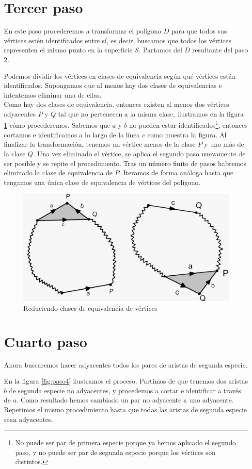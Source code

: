 \documentclass[a4paper,11pt,spanish, twoside, leqno]{tfg-uam}
\theoremstyle{definition}
\begin{document}
\section{Tercer paso}
En este paso procederemos a transformar el polígono $D$ para que todos sus vértices estén identificados entre sí, es decir, buscamos que todos los vértices representen el mismo punto en la superficie $S$. Partamos del $D$ resultante del paso 2.


Podemos dividir los vértices en clases de equivalencia según qué vértices están identificados. Supongamos que al menos hay dos clases de equivalencias e intentemos eliminar una de ellas.\\
Como hay dos clases de equivalencia, entonces existen al menos dos vértices adyacentes $P$ y $Q$ tal que no pertenecen a la misma clase, ilustramos en la figura \ref{fig:paso3} cómo procederemos. Sabemos que $a$ y $b$ no pueden estar identificados\footnote{No puede ser par de primera especie porque ya hemos aplicado el segundo paso, y no puede ser par de segunda especie porque los vértices son distintos.}, entonces cortamos e identificamos a lo largo de la línea $c$ como muestra la figura. Al finalizar la transformación, tenemos un vértice menos de la clase $P$ y uno más de la clase $Q$. Una vez eliminado el vértice, se aplica el segundo paso nuevamente de ser posible y se repite el procedimiento. Tras un número finito de pasos habremos eliminado la clase de equivalencia de $P$. Iteramos de forma análoga hasta que tengamos una única clase de equivalencia de vértices del polígono.
\begin{figure}[h!]
			\centering
			\includegraphics[width=0.4\linewidth]{imagenes/paso3.jpeg}
			\caption{Reduciendo clases de equivalencia de vértices}
			\label{fig:paso3}
		\end{figure}



\section{Cuarto paso}
Ahora buscaremos hacer adyacentes todos los pares de aristas de segunda especie.


En la figura \ref{fig:paso4} ilustramos el proceso. Partimos de que tenemos dos aristas $b$ de segunda especie no adyacentes, y procedemos a cortar e identificar a través de $a$. Como resultado hemos cambiado un par no adyacente a uno adyacente. Repetimos el mismo procedimiento hasta que todas las aristas de segunda especie sean adyacentes.
\end{document}
